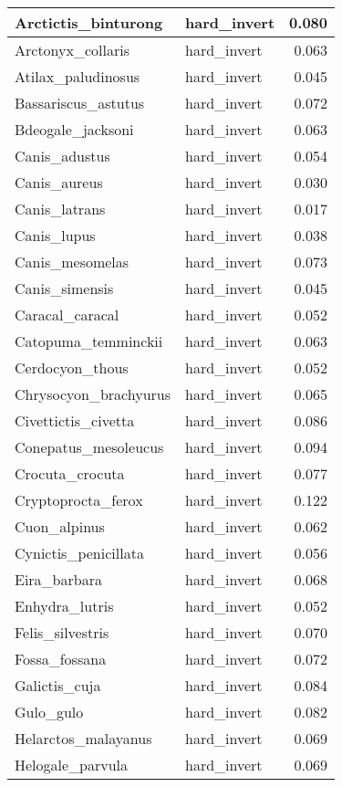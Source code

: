 \begin{table}
\begin{tabular}[t]{l|l|r}
\hline
Arctictis\_binturong & hard\_invert & 0.080\\
\hline
Arctonyx\_collaris & hard\_invert & 0.063\\
\hline
Atilax\_paludinosus & hard\_invert & 0.045\\
\hline
Bassariscus\_astutus & hard\_invert & 0.072\\
\hline
Bdeogale\_jacksoni & hard\_invert & 0.063\\
\hline
Canis\_adustus & hard\_invert & 0.054\\
\hline
Canis\_aureus & hard\_invert & 0.030\\
\hline
Canis\_latrans & hard\_invert & 0.017\\
\hline
Canis\_lupus & hard\_invert & 0.038\\
\hline
Canis\_mesomelas & hard\_invert & 0.073\\
\hline
Canis\_simensis & hard\_invert & 0.045\\
\hline
Caracal\_caracal & hard\_invert & 0.052\\
\hline
Catopuma\_temminckii & hard\_invert & 0.063\\
\hline
Cerdocyon\_thous & hard\_invert & 0.052\\
\hline
Chrysocyon\_brachyurus & hard\_invert & 0.065\\
\hline
Civettictis\_civetta & hard\_invert & 0.086\\
\hline
Conepatus\_mesoleucus & hard\_invert & 0.094\\
\hline
Crocuta\_crocuta & hard\_invert & 0.077\\
\hline
Cryptoprocta\_ferox & hard\_invert & 0.122\\
\hline
Cuon\_alpinus & hard\_invert & 0.062\\
\hline
Cynictis\_penicillata & hard\_invert & 0.056\\
\hline
Eira\_barbara & hard\_invert & 0.068\\
\hline
Enhydra\_lutris & hard\_invert & 0.052\\
\hline
Felis\_silvestris & hard\_invert & 0.070\\
\hline
Fossa\_fossana & hard\_invert & 0.072\\
\hline
Galictis\_cuja & hard\_invert & 0.084\\
\hline
Gulo\_gulo & hard\_invert & 0.082\\
\hline
Helarctos\_malayanus & hard\_invert & 0.069\\
\hline
Helogale\_parvula & hard\_invert & 0.069\\

\end{tabular}
\end{table}
